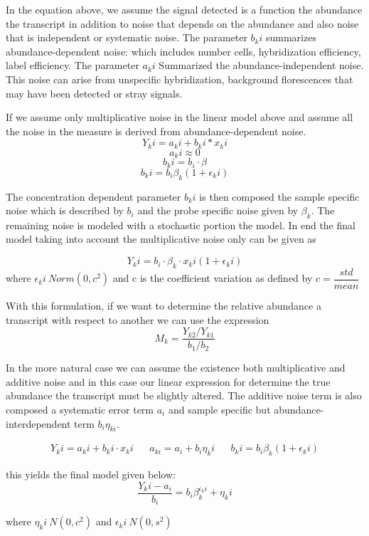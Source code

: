 \documentclass[a4paper,11pt,twoside]{book}
\begin{document}
	In the equation above, we assume the signal detected is a function the abundance the transcript in addition to noise that depends on the abundance and also noise that is independent or systematic noise. The parameter $b_ki$ summarizes abundance-dependent noise: which includes number cells, hybridization efficiency, label efficiency. The parameter  $a_ki$ Summarized the abundance-independent noise. This noise can arise from unspecific hybridization, background florescences that may have been detected or stray signals. 
	
	If we assume only multiplicative noise in the linear model above and assume all the noise in the measure is derived from abundance-dependent noise. 
	$$ Y_ki = a_ki + b_ki * x_ki $$
	$$ a_ki \approx 0 $$
	$$ b_ki = b_i \cdot\beta $$
	$$ b_ki = b_i\beta_k(1+\epsilon_ki) $$
	
	The concentration dependent parameter $b_ki$ is then composed the sample specific noise which is described by $b_i$ and the probe specific noise given by $\beta_k$. The remaining noise is modeled with a stochastic portion the model. In end the final model taking into account the multiplicative noise only can be given as
	
	$$ Y_ki = b_i\cdot\beta_k{\cdot}x_ki ( 1 + \epsilon_ki) $$ 
	where $ \epsilon_ki ~ Norm(0,c^2)$ and c is the coefficient variation as defined by $c = \dfrac{std}{mean}$
	
	With this formulation, if we want to determine the relative abundance a transcript with respect to another we can use the expression
	$$ M_k = \dfrac{Y_{k2}/Y_{k1}}{b_1/b_2} $$
	
	In the more natural case we can assume the existence both multiplicative and additive noise and in this case our linear expression for determine the true abundance the transcript must be slightly altered. The additive noise term is also composed a systematic error term $a_i$ and sample specific but abundance-interdependent term $b_i\eta_{ki}$. 
	
	\begin{align}
	Y_ki = a_ki + b_ki \cdot x_ki && a_{ki} = a_i + b_i\eta_ki && b_ki = b_i\beta_k(1+\epsilon_ki)
	\end{align}
	
	this yields the final model given below: 
	$$\dfrac{Y_ki - a_i}{b_i} = b_i\beta_k^{\epsilon_ki} + \eta_ki$$
	
	\begin{center}
		where $\eta_ki ~ N(0,c^2)$ and $\epsilon_ki ~ N(0,s^2) $
	\end{center}
	
\end{document}
